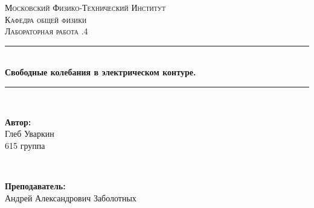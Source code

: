 \documentclass[a4paper, 12pt, twoside]{article}
\begin{document}
\begin{titlepage}

\newcommand{\HRule}{\rule{\linewidth}{0.7mm}} %

\center %
 

\textsc{\LARGE Московский Физико-Технический Институт}\\[1,5cm] %
\textsc{\Large Кафедра общей физики}\\[0.5cm] %
\textsc{\large Лабораторная работа .4}\\[0.5cm] %


\HRule
\\[0.4cm]
{ \huge \bfseries Свободные колебания в электрическом контуре.}
\\[0.2cm] %
\HRule
\\[1.5cm]


 

\begin{minipage}{0.4\textwidth}
	\begin{flushleft} \large
		\textbf{Автор:}\\
		Глеб Уваркин \\
		615 группа
	\end{flushleft}
\end{minipage}
~
\begin{minipage}{0.4\textwidth}
	\begin{flushright} \large
		\textbf {Преподаватель:} \\
		Андрей Александрович Заболотных %
	\end{flushright}
\end{minipage}


\end{titlepage}
\end{document}
